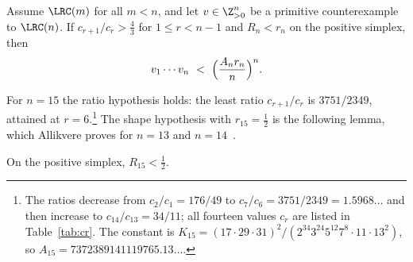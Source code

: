 \begin{theorem}\label{thm:flag}
Assume $\LRC(m)$ for all $m<n$, and let $v\in\Z_{>0}^n$ be a primitive
counterexample to $\LRC(n)$. If $c_{r+1}/c_r>\frac43$ for $1\le r<n-1$ and
$R_n<r_n$ on the positive simplex, then
\[
 v_1\cdots v_n\ <\ \Bigl(\frac{A_nr_n}n\Bigr)^n .
\]
\end{theorem}

For $n=15$ the ratio hypothesis holds: the least ratio $c_{r+1}/c_r$ is
$3751/2349$, attained at $r=6$.\footnote{The ratios decrease from
$c_2/c_1=176/49$ to $c_7/c_6=3751/2349=1.5968\ldots$ and then increase to
$c_{14}/c_{13}=34/11$; all fourteen values $c_r$ are listed in
Table~\ref{tab:cr}. The constant is
$K_{15}=(17\cdot29\cdot31)^2/(2^{34}3^{24}5^{12}7^8\cdot11\cdot13^2)$, so
$A_{15}=7372389141119765.13\ldots$.} The shape hypothesis with
$r_{15}=\frac12$ is the following lemma, which Allikvere proves for $n=13$
and $n=14$~\cite[Lemma~3.7]{All26}.

\begin{lemma}\label{lem:shape}
On the positive simplex, $R_{15}<\frac12$.
\end{lemma}

